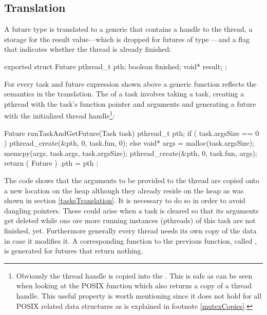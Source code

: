 \subsection{Translation}
\label{futuresTranslation}
A future type  is translated to a generic  that contains a handle to the thread, a storage for the result value---which is dropped for futures of type ---and a flag that indicates whether the thread is already finished:
\begin{ccode}
exported struct Future { 
  pthread_t pth; 
  boolean finished; 
  void* result; 
};
\end{ccode}

For every task and future expression shown above a generic function reflects the semantics in the translation. The  of a task involves taking a task, creating a pthread with the task's function pointer and arguments and generating a future with the initialized thread handle\footnote{Obviously the thread handle is copied into the . This is safe as can be seen when looking at the POSIX function  which also returns a copy of a thread handle. This useful property is worth mentioning since it does not hold for all POSIX related data structures as is explained in footnote \ref{mutexCopies}.}:
\begin{ccode}
Future runTaskAndGetFuture(Task task) { 
  pthread_t pth;
  if ( task.argsSize == 0 ) {
      pthread_create(&pth, 0, task.fun, 0);
  } else {
    void* args = malloc(task.argsSize);
    memcpy(args, task.args, task.argsSize);
    pthread_create(&pth, 0, task.fun, args);
  }
  return ( Future ){ .pth = pth }; 
}
\end{ccode}
The code shows that the arguments to be provided to the thread are copied onto a new location on the heap although they already reside on the heap as was shown in section \ref{tasksTranslation}. It is necessary to do so in order to avoid dangling pointers. These could arise when a task is cleared so that its arguments get deleted while one ore more running instances (pthreads) of this task are not finished, yet. Furthermore generally every thread needs its own copy of the data in case it modifies it. A corresponding function to the previous function, called , is generated for futures that return nothing. 



